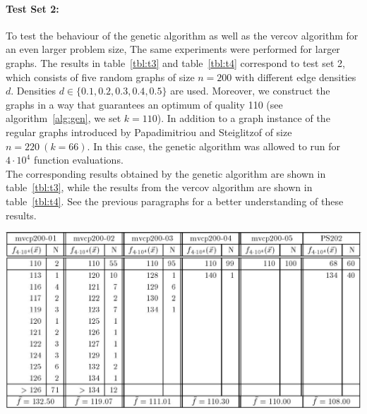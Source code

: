 \documentclass[12pt]{article}
\begin{document}
\paragraph{Test Set 2:}
To test the behaviour of the genetic algorithm
as well as the vercov algorithm for an even
larger problem size, The same experiments
were performed for larger graphs.
The results in table~\ref{tbl:t3}
and table~\ref{tbl:t4} correspond to test set 2,
which consists of five random graphs of size
$n = 200$ with different edge densities $d$.
Densities $d \in \{0.1, 0.2, 0.3, 0.4, 0.5\}$ are used.
Moreover, we construct the graphs in a way that guarantees an optimum of quality 110
(see algorithm~\ref{alg:gen}, we set $k = 110$).
In addition to a graph instance of the regular graphs introduced by
Papadimitriou and Steiglitzof of size $n = 220 \ (k=66)$.
In this case, the genetic algorithm
was allowed to run for $4 \cdot 10^4$ function evaluations.\\
The corresponding results obtained by the
genetic algorithm are shown in table~\ref{tbl:t3}, while the results
from the vercov algorithm are shown in table~\ref{tbl:t4}.
See the previous paragraphs for a better understanding of these results.

\begin{table}[!htbp]
\centering
\includegraphics[width=1\textwidth]{t3}
\caption{%
Experimental results obtained by the genetic algorithm for five random graphs of size $n = 200$ with edge density: $d = 0.1$ (``mvcp200-01''), $d = 0.2$ (``mvcp200-02''), $d = 0.3$ (``mvcp200-03''), $d = 0.5$ (``mvcp200-04''), $d = 0.5$ (``mvcp200-05'') and the regular graph of size $n = 202 \ (k=66)$ from Papadimitriou and Steiglitz (``PS202'').%
}
\label{tbl:t3}
\end{table}
\end{document}
